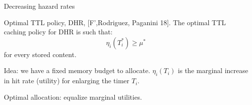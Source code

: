 \documentclass[aspectratio=169]{beamer}
\begin{document}
\begin{frame}{Decreasing hazard rates}

\begin{block}{Optimal TTL policy, DHR, [F',Rodriguez, Paganini 18].}
	The optimal TTL caching policy for DHR is such that:
   \begin{equation*}
	\eta_i (T_i^*) \geqslant \mu^*
   \end{equation*}
  for every stored content.
   \end{block}
  \vfill

  \alert{Idea:} we have a fixed memory budget to allocate. $\eta_i(T_i)$ is the marginal increase in hit rate (utility) for enlarging the timer $T_i$.

  \vfill

  \alert{Optimal allocation:} equalize marginal utilities.
\end{frame}
\end{document}
